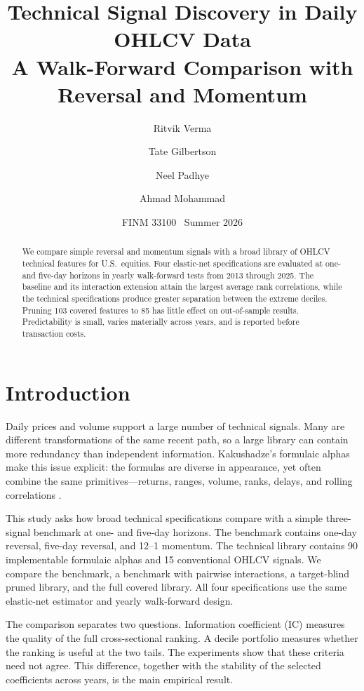 \documentclass[11pt]{article}
\title{\vspace{-1.3em}Technical Signal Discovery in Daily OHLCV Data\\
\large A Walk-Forward Comparison with Reversal and Momentum}
\author{Ritvik Verma \and Tate Gilbertson \and Neel Padhye \and Ahmad Mohammad}
\date{FINM 33100 \textperiodcentered\ Summer 2026}
\begin{document}
\maketitle
\vspace{-1.7em}

\begin{abstract}
We compare simple reversal and momentum signals with a broad library of
OHLCV technical features for U.S.\ equities. Four elastic-net specifications
are evaluated at one- and five-day horizons in yearly walk-forward tests from
2013 through 2025. The baseline and its interaction extension attain the
largest average rank correlations, while the technical specifications produce
greater separation between the extreme deciles. Pruning 103 covered features
to 85 has little effect on out-of-sample results. Predictability is small,
varies materially across years, and is reported before transaction costs.
\end{abstract}

\section{Introduction}

Daily prices and volume support a large number of technical signals. Many are
different transformations of the same recent path, so a large library can
contain more redundancy than independent information. Kakushadze's formulaic
alphas make this issue explicit: the formulas are diverse in appearance, yet
often combine the same primitives---returns, ranges, volume, ranks, delays,
and rolling correlations \cite{kakushadze}.

This study asks how broad technical specifications compare with a simple
three-signal benchmark at one- and five-day horizons. The benchmark contains
one-day reversal, five-day reversal, and 12--1 momentum. The technical library
contains 90 implementable formulaic alphas and 15 conventional OHLCV signals.
We compare the benchmark, a benchmark with pairwise interactions, a
target-blind pruned library, and the full covered library. All four
specifications use the same elastic-net estimator and yearly walk-forward
design.

The comparison separates two questions. Information coefficient (IC) measures
the quality of the full cross-sectional ranking. A decile portfolio measures
whether the ranking is useful at the two tails. The experiments show that
these criteria need not agree. This difference, together with the stability of
the selected coefficients across years, is the main empirical result.
\end{document}
